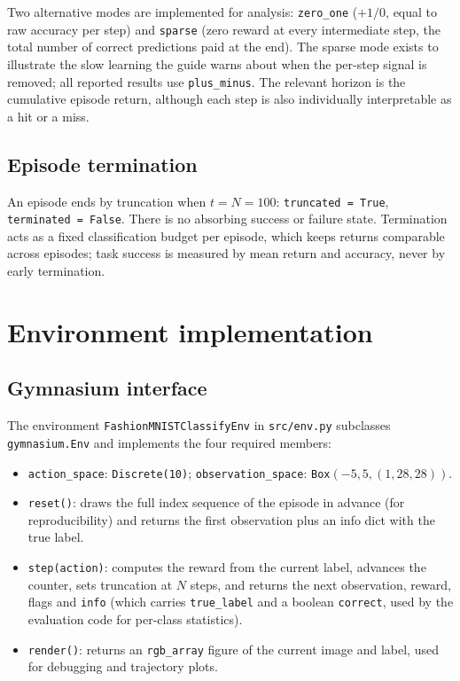 \documentclass[11pt,a4paper]{article}
\begin{document}
Two alternative modes are implemented for analysis: \texttt{zero\_one} ($+1/0$, equal to raw accuracy per step) and \texttt{sparse} (zero reward at every intermediate step, the total number of correct predictions paid at the end). The sparse mode exists to illustrate the slow learning the guide warns about when the per-step signal is removed; all reported results use \texttt{plus\_minus}. The relevant horizon is the cumulative episode return, although each step is also individually interpretable as a hit or a miss.

\subsection{Episode termination}

An episode ends by truncation when $t = N = 100$: \texttt{truncated = True}, \texttt{terminated = False}. There is no absorbing success or failure state. Termination acts as a fixed classification budget per episode, which keeps returns comparable across episodes; task success is measured by mean return and accuracy, never by early termination.

\section{Environment implementation}

\subsection{Gymnasium interface}

The environment \texttt{FashionMNISTClassifyEnv} in \texttt{src/env.py} subclasses \texttt{gymnasium.Env} and implements the four required members:

\begin{itemize}
\item \texttt{action\_space}: \texttt{Discrete(10)}; \texttt{observation\_space}: \texttt{Box}$(-5, 5, (1,28,28))$.
\item \texttt{reset()}: draws the full index sequence of the episode in advance (for reproducibility) and returns the first observation plus an info dict with the true label.
\item \texttt{step(action)}: computes the reward from the current label, advances the counter, sets truncation at $N$ steps, and returns the next observation, reward, flags and \texttt{info} (which carries \texttt{true\_label} and a boolean \texttt{correct}, used by the evaluation code for per-class statistics).
\item \texttt{render()}: returns an \texttt{rgb\_array} figure of the current image and label, used for debugging and trajectory plots.
\end{itemize}
\end{document}
